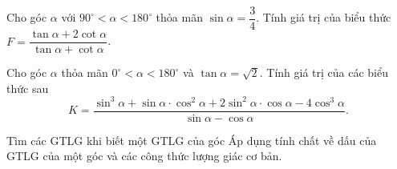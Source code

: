 \begin{bt}
Cho góc $\alpha$ với $90^\circ<\alpha<180^\circ$ thỏa mãn $\sin\alpha=\dfrac{3}{4}$. Tính giá trị của biểu thức $F=\dfrac{\tan\alpha+2\cot\alpha}{\tan\alpha+\cot\alpha}$.
\end{bt}

\begin{bt}
Cho góc $\alpha$ thỏa mãn $0^\circ<\alpha<180^\circ$ và $\tan\alpha=\sqrt{2}$. Tính giá trị của các biểu thức sau $$K=\dfrac{\sin^3\alpha+\sin\alpha\cdot\cos^2\alpha+2\sin^2\alpha\cdot\cos\alpha-4\cos^3\alpha}{\sin\alpha-\cos\alpha}.$$
\end{bt}
\begin{dang}{Tìm các GTLG khi biết một GTLG của góc}
Áp dụng tính chất về dấu của GTLG của một góc và các công thức lượng giác cơ bản.
\end{dang}
\viduminhhoa
